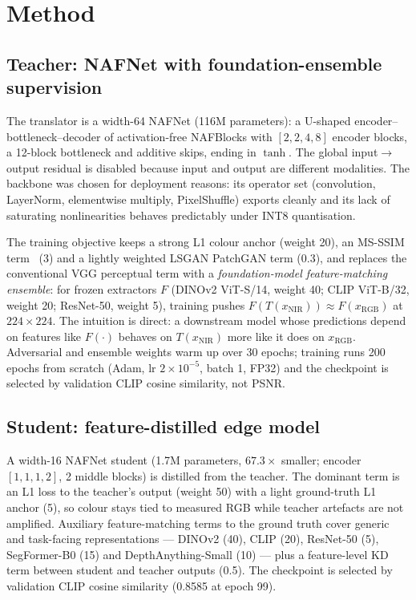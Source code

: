 \documentclass[10pt,twocolumn,letterpaper]{article}
\begin{document}
\section{Method}
\label{sec:method}

\subsection{Teacher: NAFNet with foundation-ensemble supervision}

The translator is a width-64 NAFNet (116M parameters): a U-shaped encoder--bottleneck--decoder of activation-free NAFBlocks with $[2,2,4,8]$ encoder blocks, a 12-block bottleneck and additive skips, ending in $\tanh$. The global input$\rightarrow$output residual is disabled because input and output are different modalities. The backbone was chosen for deployment reasons: its operator set (convolution, LayerNorm, elementwise multiply, PixelShuffle) exports cleanly and its lack of saturating nonlinearities behaves predictably under INT8 quantisation.

The training objective keeps a strong L1 colour anchor (weight 20), an MS-SSIM term~\cite{wang2003msssim} (3) and a lightly weighted LSGAN PatchGAN term (0.3), and replaces the conventional VGG perceptual term with a \emph{foundation-model feature-matching ensemble}: for frozen extractors $F$ (DINOv2 ViT-S/14, weight 40; CLIP ViT-B/32, weight 20; ResNet-50, weight 5), training pushes $F(T(x_{\text{NIR}}))\approx F(x_{\text{RGB}})$ at $224\times224$. The intuition is direct: a downstream model whose predictions depend on features like $F(\cdot)$ behaves on $T(x_{\text{NIR}})$ more like it does on $x_{\text{RGB}}$. Adversarial and ensemble weights warm up over 30 epochs; training runs 200 epochs from scratch (Adam, lr $2\times10^{-5}$, batch 1, FP32) and the checkpoint is selected by validation CLIP cosine similarity, not PSNR.

\subsection{Student: feature-distilled edge model}
\label{sec:student}

A width-16 NAFNet student (1.7M parameters, $67.3\times$ smaller; encoder $[1,1,1,2]$, 2 middle blocks) is distilled from the teacher. The dominant term is an L1 loss to the teacher's output (weight 50) with a light ground-truth L1 anchor (5), so colour stays tied to measured RGB while teacher artefacts are not amplified. Auxiliary feature-matching terms to the ground truth cover generic and task-facing representations --- DINOv2 (40), CLIP (20), ResNet-50 (5), SegFormer-B0 (15) and DepthAnything-Small (10) --- plus a feature-level KD term between student and teacher outputs (0.5). The checkpoint is selected by validation CLIP cosine similarity (0.8585 at epoch 99).
\end{document}
